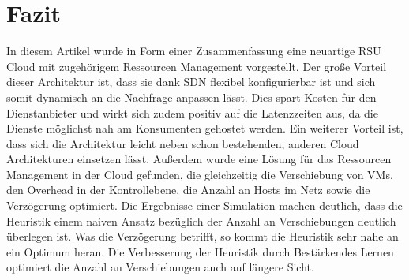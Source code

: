 \documentclass[conference]{IEEEtran}
\begin{document}
\section{Fazit}

In diesem Artikel wurde in Form einer Zusammenfassung eine neuartige RSU Cloud mit zugehörigem Ressourcen Management vorgestellt. Der große Vorteil dieser Architektur ist, dass sie dank SDN flexibel konfigurierbar ist und sich somit dynamisch an die Nachfrage anpassen lässt. Dies spart Kosten für den Dienstanbieter und wirkt sich zudem positiv auf die Latenzzeiten aus, da die Dienste möglichst nah am Konsumenten gehostet werden. Ein weiterer Vorteil ist, dass sich die Architektur leicht neben schon bestehenden, anderen Cloud Architekturen einsetzen lässt.
Außerdem wurde eine Lösung für das Ressourcen Management in der Cloud gefunden, die gleichzeitig die Verschiebung von VMs, den Overhead in der Kontrollebene, die Anzahl an Hosts im Netz sowie die Verzögerung optimiert.
Die Ergebnisse einer Simulation machen deutlich, dass die Heuristik einem naiven Ansatz bezüglich der Anzahl an Verschiebungen deutlich überlegen ist. Was die Verzögerung betrifft, so kommt die Heuristik sehr nahe an ein Optimum heran.
Die Verbesserung der Heuristik durch Bestärkendes Lernen optimiert die Anzahl an Verschiebungen auch auf längere Sicht. 





%
%
%

\end{document}
